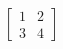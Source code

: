 \documentclass{standalone}
\begin{document}
$\left[\begin{matrix}1 & 2\\3 & 4\end{matrix}\right]$
\end{document}
